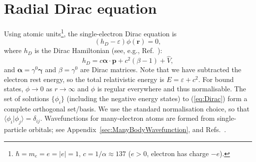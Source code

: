 \documentclass[10pt,twocolumn,a4paper]{article}%
\newcommand{\braket}[1]{\ensuremath{\langle #1\rangle}}	%
\renewcommand{\v}[1]{\ensuremath{\boldsymbol{#1}}}		%
\newcommand{\be}{\begin{equation}}
\newcommand{\ee}{\end{equation}}
\def\h{\ensuremath{\hbar}}
\def\en{\ensuremath{\varepsilon}}
\renewcommand{\b}{\ensuremath{\beta}}
\newcommand{\g}{\ensuremath{\gamma}}
\begin{document}


{\footnotesize
\tableofcontents
}

\section{Radial Dirac equation}


Using atomic units\footnote{$\h=m_e=e=|e|=1$, $c=1/\alpha\approx137$ ($e>0$, electron has charge $-e$).}, the single-electron Dirac equation is
\be\label{eq:Dirac}
\left(h_D - \en\right) \phi(\v{r}) = 0,
\ee
where $h_D$ is the Dirac Hamiltonian (see, e.g., Ref.~\cite{BetheBook}):
\be\label{eq:H-Dirac}
h_D = c \v{\alpha}\cdot\v{p} + c^2(\beta-1) + \hat V,
\ee
and $\v{\alpha} = \g^0\v{\g}$ and $\b=\g^0$ are Dirac matrices.
Note that we have subtracted the electron rest energy, so the total relativistic energy is $E = \en + c^2$.
For bound states, $\phi\to0$ as $r\to\infty$ and $\phi$ is regular everywhere and thus normalisable.
The set of solutions $\{\phi_i\}$ (including the negative energy states) to (\ref{eq:Dirac}) form a complete orthogonal set/basis.
We use the standard normalisation choice, so that $\braket{\phi_i|\phi_j} = \delta_{ij}$.
%
Wavefunctions for many-electron atoms are formed from single-particle orbitals; see Appendix~\ref{sec:ManyBodyWavefunction}, and Refs.~\cite{Lindgren1986,JohnsonBook2007}.
\end{document}
